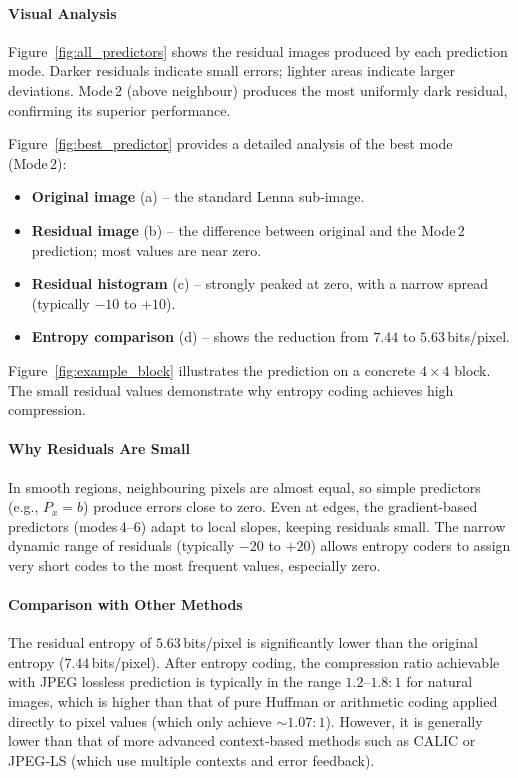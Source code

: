 \paragraph{Visual Analysis}
Figure~\ref{fig:all_predictors} shows the residual images produced by each prediction mode. Darker residuals indicate small errors; lighter areas indicate larger deviations. Mode 2 (above neighbour) produces the most uniformly dark residual, confirming its superior performance.

Figure~\ref{fig:best_predictor} provides a detailed analysis of the best mode (Mode 2):
\begin{itemize}
    \item \textbf{Original image} (a) – the standard Lenna sub‑image.
    \item \textbf{Residual image} (b) – the difference between original and the Mode 2 prediction; most values are near zero.
    \item \textbf{Residual histogram} (c) – strongly peaked at zero, with a narrow spread (typically \(-10\) to \(+10\)).
    \item \textbf{Entropy comparison} (d) – shows the reduction from \(7.44\) to \(5.63\) bits/pixel.
\end{itemize}

Figure~\ref{fig:example_block} illustrates the prediction on a concrete \(4\times4\) block. The small residual values demonstrate why entropy coding achieves high compression.

\paragraph{Why Residuals Are Small}
In smooth regions, neighbouring pixels are almost equal, so simple predictors (e.g., \(P_x = b\)) produce errors close to zero. Even at edges, the gradient‑based predictors (modes 4–6) adapt to local slopes, keeping residuals small. The narrow dynamic range of residuals (typically \(-20\) to \(+20\)) allows entropy coders to assign very short codes to the most frequent values, especially zero.

\paragraph{Comparison with Other Methods}
The residual entropy of \(5.63\) bits/pixel is significantly lower than the original entropy (\(7.44\) bits/pixel). After entropy coding, the compression ratio achievable with JPEG lossless prediction is typically in the range \(1.2\)–\(1.8:1\) for natural images, which is higher than that of pure Huffman or arithmetic coding applied directly to pixel values (which only achieve \(\sim1.07:1\)). However, it is generally lower than that of more advanced context‑based methods such as CALIC or JPEG‑LS (which use multiple contexts and error feedback).

